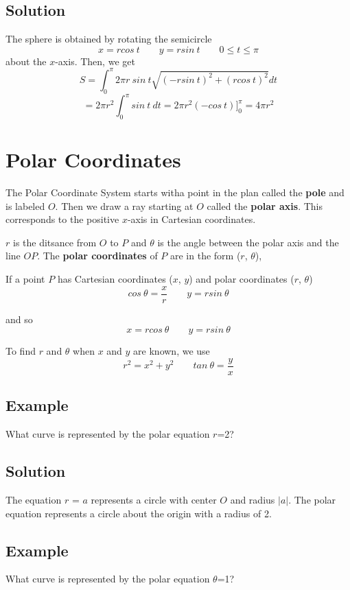 \subsection*{Solution}
The sphere is obtained by rotating the semicircle
$$x=rcos\:t \qquad y=rsin\:t \qquad 0\leq t\leq \pi$$
about the $x$-axis. Then, we get
$$S=\int_0^\pi 2\pi r\: sin\:t\sqrt{(-rsin\:t)^2+(rcos\:t)^2}dt$$
$$=2\pi r^2\int_0^\pi sin\:t\:dt = 2\pi r^2(-cos\:t)]_0^\pi = 4\pi r^2$$

\section{Polar Coordinates}
The Polar Coordinate System starts witha point in the plan called the \textbf{pole}
and is labeled $O$. Then we draw a ray starting at $O$ called the \textbf{polar axis}.
This corresponds to the positive $x$-axis in Cartesian coordinates. \par

$r$ is the ditsance from $O$ to $P$ and $\theta$ is the angle between the polar axis
and the line $OP$. The \textbf{polar coordinates} of $P$ are in the form ($r$, $\theta$), \par

If a point $P$ has Cartesian coordinates ($x$, $y$) and polar coordinates ($r$, $\theta$)
$$ cos \: \theta = \frac{x}{r} \qquad y = r sin \: \theta $$

and so
$$ x=r cos \: \theta \qquad y = r sin \: \theta$$

To find $r$ and $\theta$ when $x$ and $y$ are known, we use
$$ r^2 = x^2 + y^2 \qquad tan \: \theta = \frac{y}{x} $$

\subsection*{Example}
What curve is represented by the polar equation $r$=2?

\subsection*{Solution}
The equation $r$ = $a$ represents a circle with center $O$ and radius $|a|$.
The polar equation represents a circle about the origin with a radius of 2.

\subsection*{Example}
What curve is represented by the polar equation $\theta$=1?

